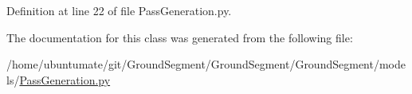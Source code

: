 Definition at line 22 of file Pass\+Generation.\+py.



The documentation for this class was generated from the following file\+:\begin{DoxyCompactItemize}
\item 
/home/ubuntumate/git/\+Ground\+Segment/\+Ground\+Segment/\+Ground\+Segment/models/\hyperlink{_pass_generation_8py}{Pass\+Generation.\+py}\end{DoxyCompactItemize}
